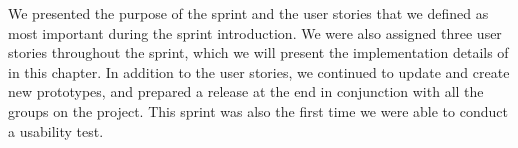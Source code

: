 We presented the purpose of the sprint and the user stories that we defined as most important during the sprint introduction.
We were also assigned three user stories throughout the sprint, which we will present the implementation details of in this chapter.
In addition to the user stories, we continued to update and create new prototypes, and prepared a release at the end in conjunction with all the groups on the project.
This sprint was also the first time we were able to conduct a usability test.
